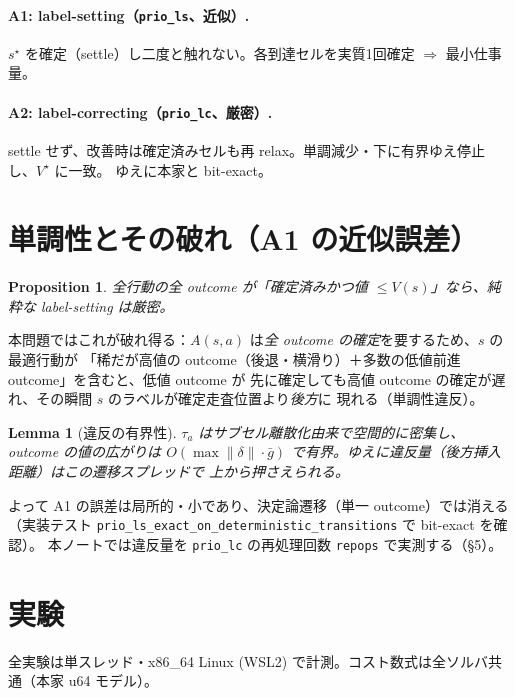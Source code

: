 \documentclass[11pt]{article}
\newtheorem{lemma}{Lemma}
\newtheorem{proposition}{Proposition}
\begin{document}
\paragraph{A1: label-setting（\texttt{prio\_ls}、近似）.}
$s^\star$ を確定（settle）し二度と触れない。各到達セルを実質1回確定 $\Rightarrow$ 最小仕事量。
\paragraph{A2: label-correcting（\texttt{prio\_lc}、厳密）.}
settle せず、改善時は確定済みセルも再 relax。単調減少・下に有界ゆえ停止し、$V^\star$ に一致。
ゆえに本家と bit-exact。

\section{単調性とその破れ（A1 の近似誤差）}
\begin{proposition}
全行動の全 outcome が「確定済みかつ値 $\le V(s)$」なら、純粋な label-setting は厳密。
\end{proposition}
本問題ではこれが破れ得る：$A(s,a)$ は\emph{全 outcome の確定}を要するため、$s$ の最適行動が
「稀だが高値の outcome（後退・横滑り）＋多数の低値前進 outcome」を含むと、低値 outcome が
先に確定しても高値 outcome の確定が遅れ、その瞬間 $s$ のラベルが確定走査位置より\emph{後方}に
現れる（単調性違反）。
\begin{lemma}[違反の有界性]
$\tau_a$ はサブセル離散化由来で空間的に密集し、outcome の値の広がりは
$O(\max\|\delta\|\cdot \bar g)$ で有界。ゆえに違反量（後方挿入距離）はこの遷移スプレッドで
上から押さえられる。
\end{lemma}
よって A1 の誤差は局所的・小であり、決定論遷移（単一 outcome）では消える（実装テスト
\texttt{prio\_ls\_exact\_on\_deterministic\_transitions} で bit-exact を確認）。
本ノートでは違反量を \texttt{prio\_lc} の再処理回数 \texttt{repops} で実測する（\S5）。

\section{実験}
全実験は単スレッド・x86\_64 Linux (WSL2) で計測。コスト数式は全ソルバ共通（本家 u64 モデル）。
\end{document}
